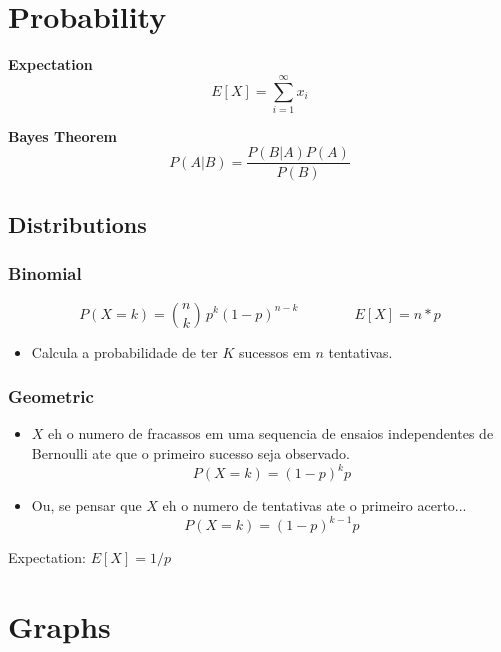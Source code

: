 \documentclass[10pt, twocolumn]{article}
\begin{document}
\begin{flushleft}
\section{Probability}

\textbf{Expectation}
$$E[X] = \sum_{i=1}^{\infty} x_i$$

\textbf{Bayes Theorem}
$$P(A|B) = \frac{P(B|A) P(A)}{P(B)}$$

\subsection{Distributions}
\subsubsection{Binomial}

$$P(X = k) = \binom{n}{k}\,p^{k}(1-p)^{n-k} \qquad \qquad E[X] = n*p$$

\begin{itemize}
\item Calcula a probabilidade de ter $K$ sucessos em $n$ tentativas.
\end{itemize}



\subsubsection{Geometric}
\begin{itemize}
\item $X$ eh o numero de fracassos em uma sequencia de ensaios independentes de Bernoulli ate que o primeiro sucesso seja observado.$$P(X = k) = (1-p)^{k}p$$
\item Ou, se pensar que $X$ eh o numero de tentativas ate o primeiro acerto...
$$P(X = k) = (1-p)^{k-1}p$$
\end{itemize}


Expectation: $E[X] = 1/p$




\section{Graphs}


\end{flushleft}
\end{document}
